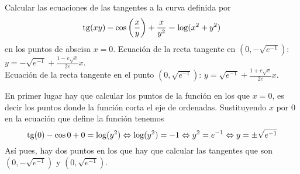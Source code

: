 {Calcular las ecuaciones de las tangentes a la curva definida por
\[
\operatorname{tg}(xy) -\cos\left(\frac{x}{y}\right) +\frac{x}{y^2} = \log (x^2+y^2)
\]
en los puntos de abscisa $x=0$.
}
{Ecuación de la recta tangente en $(0,-\sqrt{e^{-1}})$: $y = -\sqrt{e^{-1}} + \frac{1-e\sqrt{e}}{2e} x$.\\
Ecuación de la recta tangente en el punto  $(0,\sqrt{e^{-1}})$: $y = \sqrt{e^{-1}} + \frac{1+e\sqrt{e}}{2e} x$.
}
{En primer lugar hay que calcular los puntos de la función en los que $x=0$, es decir los puntos donde la función corta el eje de ordenadas. Sustituyendo $x$ por 0 en la ecuación que define la función tenemos
\[
\operatorname{tg}(0) -\cos 0 + 0 = \log (y^2) \Leftrightarrow \log(y^2) = -1
\Leftrightarrow y^2 = e^{-1} \Leftrightarrow y=\pm \sqrt{e^{-1}}
\]
Así pues, hay dos puntos en los que hay que calcular las tangentes que son
$(0,-\sqrt{e^{-1}})$ y $(0,\sqrt{e^{-1}})$.

}
